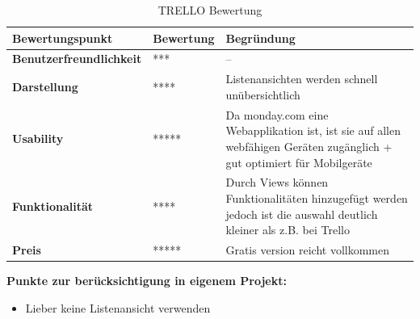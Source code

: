 \begin{table}[H]
    \centering
    \settowidth{}
    \setlength\extrarowheight{2pt}
    \begin{tabulary}{1.0\textwidth}{|L|L|L|}
      \hline
      \textbf{Bewertungspunkt} &
      \textbf{Bewertung} &
      \textbf{Begründung} \\
      \hline
      \textbf{Benutzerfreundlichkeit} &
      ***&
      --\\
      \hline
      \textbf{Darstellung} &
      ****&
     Listenansichten werden schnell unübersichtlich\\
      \hline
      \textbf{Usability} &
      *****&
      Da monday.com eine Webapplikation ist, ist sie auf allen webfähigen Geräten zugänglich + gut optimiert für Mobilgeräte\\
      \hline
      \textbf{Funktionalität} &
      ****&
      Durch Views können Funktionalitäten hinzugefügt werden jedoch ist die auswahl deutlich kleiner als z.B. bei Trello\\
      \hline
      \textbf{Preis} &
      *****&
      Gratis version reicht vollkommen\\
      \hline
    \end{tabulary}
    \caption{TRELLO Bewertung}
  \end{table}
\space
\textbf{Punkte zur berücksichtigung in eigenem Projekt:}
\begin{itemize}
    \item Lieber keine Listenansicht verwenden
\end{itemize}

  
  
